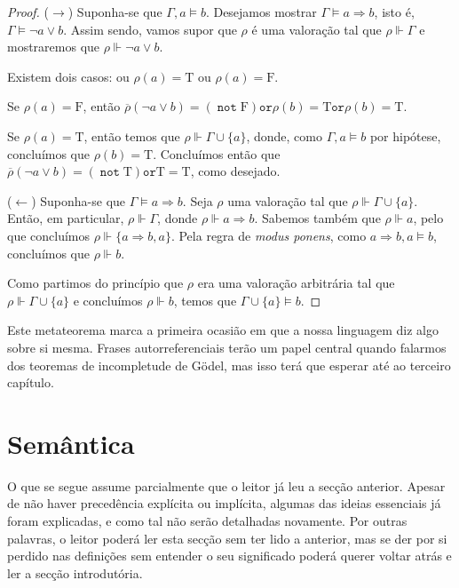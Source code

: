\documentclass{report}
\theoremstyle{definition}
\theoremstyle{remark}
\newcommand{\lt}{\mathrm{T}}
\newcommand{\lf}{\mathrm{F}}
\DeclareMathOperator{\pnot}{\texttt{not}}
\newcommand{\por}{\mathbin{\texttt{or}}}
\newcommand{\imply}{\mathbin{\Rightarrow}}
\begin{document}
	\begin{proof}\label{dem:mtd}
	($\rightarrow$) Suponha-se que $\Gamma, a \vDash b$. Desejamos mostrar $\Gamma \vDash a \imply b$, isto é, $\Gamma \vDash \neg a \lor b$. Assim sendo, vamos supor que $\rho$ é uma valoração tal que $\rho \Vdash \Gamma$ e mostraremos que $\rho \Vdash \neg a \lor b$.
	
	Existem dois casos: ou $\rho(a) = \lt$ ou $\rho(a) = \lf$.
	
	Se $\rho(a) = \lf$, então $\overline\rho(\neg a \lor b) = (\pnot \lf) \por \rho(b) = \lt \por \rho(b) = \lt$.
	
	Se $\rho(a) = \lt$, então temos que $\rho \Vdash \Gamma \cup \{a\}$, donde, como $\Gamma, a \vDash b$ por hipótese, concluímos que $\rho(b) = \lt$. Concluímos então que $\overline\rho(\neg a \lor b) = (\pnot \lt) \por \lt = \lt$, como desejado.
	
	($\leftarrow$) Suponha-se que $\Gamma \vDash a \imply b$. Seja $\rho$ uma valoração tal que $\rho \Vdash \Gamma \cup \{a\}$. Então, em particular, $\rho \Vdash \Gamma$, donde $\rho \Vdash a \imply b$. Sabemos também que $\rho \Vdash a$, pelo que concluímos $\rho \Vdash \{a \imply b, a\}$. Pela regra de \textit{modus ponens}, como $a \imply b, a \vDash b$, concluímos que $\rho \Vdash b$.
	
	Como partimos do princípio que $\rho$ era uma valoração arbitrária tal que $\rho \Vdash \Gamma \cup \{a\}$ e concluímos $\rho \Vdash b$, temos que $\Gamma \cup \{a\} \vDash b$.
	\end{proof}
	
	Este metateorema marca a primeira ocasião em que a nossa linguagem diz algo sobre si mesma. Frases autorreferenciais terão um papel central quando falarmos dos teoremas de incompletude de Gödel, mas isso terá que esperar até ao terceiro capítulo.
	
	\section{Semântica}
	
	O que se segue assume parcialmente que o leitor já leu a secção anterior. Apesar de não haver precedência explícita ou implícita, algumas das ideias essenciais já foram explicadas, e como tal não serão detalhadas novamente. Por outras palavras, o leitor poderá ler esta secção sem ter lido a anterior, mas se der por si perdido nas definições sem entender o seu significado poderá querer voltar atrás e ler a secção introdutória.
	
\end{document}
